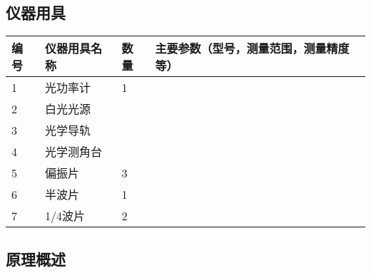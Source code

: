 \documentclass[dvipsnames, svgnames,a4paper,11pt]{article}
\begin{document}
\subsection{仪器用具}
\begin{table}[htbp]
	\centering
	\renewcommand\arraystretch{1.6}
	\begin{tabular}{p{}|p{}|p{}|p{}}
	\hline
	编号& 仪器用具名称 & 数量 &  主要参数（型号，测量范围，测量精度等） \\
	\hline
	1&光功率计 	&1 	& \\

	2&白光光源 	& 	&  \\
	
	3&光学导轨 	&  & \\
	
	4&光学测角台& & \\
	
	5&偏振片	&3 & \\

	6&半波片	&1 & \\

	7&1/4波片	&2 & \\

	
	\hline
\end{tabular}
\end{table}

\subsection{原理概述}
\end{document}
